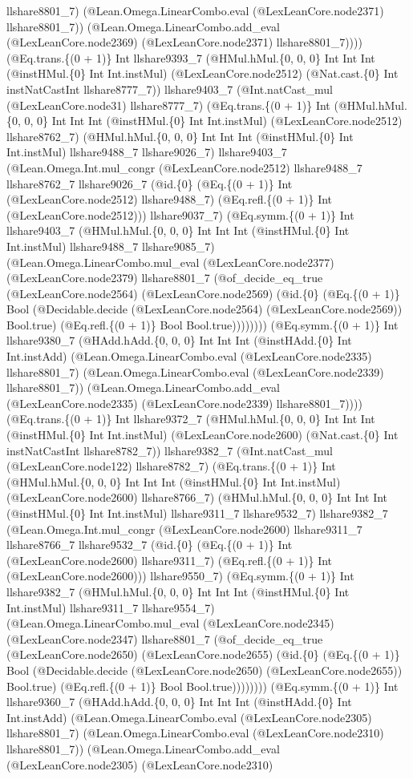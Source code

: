 \documentclass[11pt]{article}
\begin{document}
llshare8801\_7) (@Lean.Omega.LinearCombo.eval (@LexLeanCore.node2371) llshare8801\_7)) (@Lean.Omega.LinearCombo.add\_eval (@LexLeanCore.node2369) (@LexLeanCore.node2371) llshare8801\_7)))) (@Eq.trans.\{(0 + 1)\} Int llshare9393\_7 (@HMul.hMul.\{0, 0, 0\} Int Int Int (@instHMul.\{0\} Int Int.instMul) (@LexLeanCore.node2512) (@Nat.cast.\{0\} Int instNatCastInt llshare8777\_7)) llshare9403\_7 (@Int.natCast\_mul (@LexLeanCore.node31) llshare8777\_7) (@Eq.trans.\{(0 + 1)\} Int (@HMul.hMul.\{0, 0, 0\} Int Int Int (@instHMul.\{0\} Int Int.instMul) (@LexLeanCore.node2512) llshare8762\_7) (@HMul.hMul.\{0, 0, 0\} Int Int Int (@instHMul.\{0\} Int Int.instMul) llshare9488\_7 llshare9026\_7) llshare9403\_7 (@Lean.Omega.Int.mul\_congr (@LexLeanCore.node2512) llshare9488\_7 llshare8762\_7 llshare9026\_7 (@id.\{0\} (@Eq.\{(0 + 1)\} Int (@LexLeanCore.node2512) llshare9488\_7) (@Eq.refl.\{(0 + 1)\} Int (@LexLeanCore.node2512))) llshare9037\_7) (@Eq.symm.\{(0 + 1)\} Int llshare9403\_7 (@HMul.hMul.\{0, 0, 0\} Int Int Int (@instHMul.\{0\} Int Int.instMul) llshare9488\_7 llshare9085\_7) (@Lean.Omega.LinearCombo.mul\_eval (@LexLeanCore.node2377) (@LexLeanCore.node2379) llshare8801\_7 (@of\_decide\_eq\_true (@LexLeanCore.node2564) (@LexLeanCore.node2569) (@id.\{0\} (@Eq.\{(0 + 1)\} Bool (@Decidable.decide (@LexLeanCore.node2564) (@LexLeanCore.node2569)) Bool.true) (@Eq.refl.\{(0 + 1)\} Bool Bool.true)))))))) (@Eq.symm.\{(0 + 1)\} Int llshare9380\_7 (@HAdd.hAdd.\{0, 0, 0\} Int Int Int (@instHAdd.\{0\} Int Int.instAdd) (@Lean.Omega.LinearCombo.eval (@LexLeanCore.node2335) llshare8801\_7) (@Lean.Omega.LinearCombo.eval (@LexLeanCore.node2339) llshare8801\_7)) (@Lean.Omega.LinearCombo.add\_eval (@LexLeanCore.node2335) (@LexLeanCore.node2339) llshare8801\_7)))) (@Eq.trans.\{(0 + 1)\} Int llshare9372\_7 (@HMul.hMul.\{0, 0, 0\} Int Int Int (@instHMul.\{0\} Int Int.instMul) (@LexLeanCore.node2600) (@Nat.cast.\{0\} Int instNatCastInt llshare8782\_7)) llshare9382\_7 (@Int.natCast\_mul (@LexLeanCore.node122) llshare8782\_7) (@Eq.trans.\{(0 + 1)\} Int (@HMul.hMul.\{0, 0, 0\} Int Int Int (@instHMul.\{0\} Int Int.instMul) (@LexLeanCore.node2600) llshare8766\_7) (@HMul.hMul.\{0, 0, 0\} Int Int Int (@instHMul.\{0\} Int Int.instMul) llshare9311\_7 llshare9532\_7) llshare9382\_7 (@Lean.Omega.Int.mul\_congr (@LexLeanCore.node2600) llshare9311\_7 llshare8766\_7 llshare9532\_7 (@id.\{0\} (@Eq.\{(0 + 1)\} Int (@LexLeanCore.node2600) llshare9311\_7) (@Eq.refl.\{(0 + 1)\} Int (@LexLeanCore.node2600))) llshare9550\_7) (@Eq.symm.\{(0 + 1)\} Int llshare9382\_7 (@HMul.hMul.\{0, 0, 0\} Int Int Int (@instHMul.\{0\} Int Int.instMul) llshare9311\_7 llshare9554\_7) (@Lean.Omega.LinearCombo.mul\_eval (@LexLeanCore.node2345) (@LexLeanCore.node2347) llshare8801\_7 (@of\_decide\_eq\_true (@LexLeanCore.node2650) (@LexLeanCore.node2655) (@id.\{0\} (@Eq.\{(0 + 1)\} Bool (@Decidable.decide (@LexLeanCore.node2650) (@LexLeanCore.node2655)) Bool.true) (@Eq.refl.\{(0 + 1)\} Bool Bool.true)))))))) (@Eq.symm.\{(0 + 1)\} Int llshare9360\_7 (@HAdd.hAdd.\{0, 0, 0\} Int Int Int (@instHAdd.\{0\} Int Int.instAdd) (@Lean.Omega.LinearCombo.eval (@LexLeanCore.node2305) llshare8801\_7) (@Lean.Omega.LinearCombo.eval (@LexLeanCore.node2310) llshare8801\_7)) (@Lean.Omega.LinearCombo.add\_eval (@LexLeanCore.node2305) (@LexLeanCore.node2310) 
\end{document}
